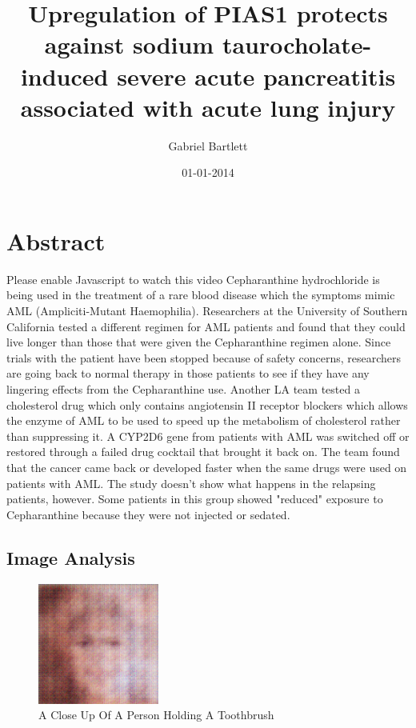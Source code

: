 \documentclass{article}%
\title{Upregulation of PIAS1 protects against sodium taurocholate{-}induced severe acute pancreatitis associated with acute lung injury}%
\author{Gabriel Bartlett}%
\affil{Department of Developmental, Molecular and Chemical Biology, Tufts University School of Medicine, Boston, Massachusetts, United States of America}%
\date{01{-}01{-}2014}%
\begin{document}
%
\normalsize%
\maketitle%
\section{Abstract}%
\label{sec:Abstract}%
Please enable Javascript to watch this video\newline%
Cepharanthine hydrochloride is being used in the treatment of a rare blood disease which the symptoms mimic AML (Ampliciti{-}Mutant Haemophilia).\newline%
Researchers at the University of Southern California tested a different regimen for AML patients and found that they could live longer than those that were given the Cepharanthine regimen alone.\newline%
Since trials with the patient have been stopped because of safety concerns, researchers are going back to normal therapy in those patients to see if they have any lingering effects from the Cepharanthine use.\newline%
Another LA team tested a cholesterol drug which only contains angiotensin II receptor blockers which allows the enzyme of AML to be used to speed up the metabolism of cholesterol rather than suppressing it.\newline%
A CYP2D6 gene from patients with AML was switched off or restored through a failed drug cocktail that brought it back on. The team found that the cancer came back or developed faster when the same drugs were used on patients with AML.\newline%
The study doesn't show what happens in the relapsing patients, however. Some patients in this group showed "reduced" exposure to Cepharanthine because they were not injected or sedated.

%
\subsection{Image Analysis}%
\label{subsec:ImageAnalysis}%


\begin{figure}[h!]%
\centering%
\includegraphics[width=150px]{500_fake_images/samples_5_186.png}%
\caption{A Close Up Of A Person Holding A Toothbrush}%
\end{figure}

%
\end{document}
